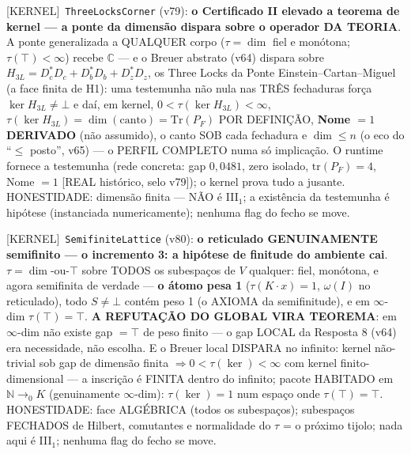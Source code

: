 \documentclass[11pt]{article}
\providecommand{\kernelmk}[1]{\textsf{[KERNEL]}~\texttt{#1}}\providecommand{\knownmk}[1]{\textsf{[KNOWN]}~{#1}}\providecommand{\statusmk}[1]{\textsf{[#1]}}
\theoremstyle{definition}\newtheorem{deriv}{Derivação}
\begin{document}
\kernelmk{ThreeLocksCorner} (v79): \textbf{o Certificado II elevado a teorema de kernel --- a ponte da dimensão dispara sobre o operador DA TEORIA}. A ponte generalizada a QUALQUER corpo ($\tau=\dim$ fiel e monótona; $\tau(\top)<\infty$) recebe $\mathbb C$ --- e o Breuer abstrato (v64) dispara sobre $H_{3L}=D_c^*D_c+D_b^*D_b+D_z^*D_z$, os Three Locks da Ponte Einstein--Cartan--Miguel (a face finita de H1): uma testemunha não nula nas TRÊS fechaduras força $\ker H_{3L}\neq\bot$ e daí, em kernel, $0<\tau(\ker H_{3L})<\infty$, $\tau(\ker H_{3L})=\dim(\mathrm{canto})=\mathrm{Tr}(P_F)$ POR DEFINIÇÃO, \textbf{Nome $=1$ DERIVADO} (não assumido), o canto SOB cada fechadura e $\dim\le n$ (o eco do ``$\le$ posto'', v65) --- o PERFIL COMPLETO numa só implicação. O runtime fornece a testemunha (rede concreta: gap $0{,}0481$, zero isolado, $\mathrm{tr}(P_F)=4$, Nome $=1$ [REAL histórico, selo v79]); o kernel prova tudo a jusante. HONESTIDADE: dimensão finita --- NÃO é III$_1$; a existência da testemunha é hipótese (instanciada numericamente); nenhuma flag do fecho se move.

\kernelmk{SemifiniteLattice} (v80): \textbf{o reticulado GENUINAMENTE semifinito --- o incremento 3: a hipótese de finitude do ambiente cai}. $\tau=\dim$-ou-$\top$ sobre TODOS os subespaços de $V$ qualquer: fiel, monótona, e agora semifinita de verdade --- \textbf{o átomo pesa 1} ($\tau(K\!\cdot\!x)=1$, $\omega(I)$ no reticulado), todo $S\neq\bot$ contém peso 1 (o AXIOMA da semifinitude), e em $\infty$-dim $\tau(\top)=\top$. \textbf{A REFUTAÇÃO DO GLOBAL VIRA TEOREMA}: em $\infty$-dim não existe gap $=\top$ de peso finito --- o gap LOCAL da Resposta 8 (v64) era necessidade, não escolha. E o Breuer local DISPARA no infinito: kernel não-trivial sob gap de dimensão finita $\Rightarrow 0<\tau(\ker)<\infty$ com kernel finito-dimensional --- a inscrição é FINITA dentro do infinito; pacote HABITADO em $\mathbb N\to_0 K$ (genuinamente $\infty$-dim): $\tau(\ker)=1$ num espaço onde $\tau(\top)=\top$. HONESTIDADE: face ALGÉBRICA (todos os subespaços); subespaços FECHADOS de Hilbert, comutantes e normalidade do $\tau$ = o próximo tijolo; nada aqui é III$_1$; nenhuma flag do fecho se move.
\end{document}
